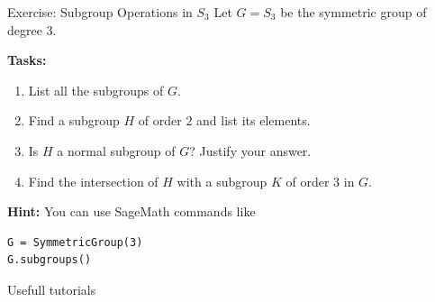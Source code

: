 \documentclass[10pt]{beamer}
\begin{document}
\begin{frame}[fragile]{Exercise: Subgroup Operations in $S_3$}
Let $G = S_3$ be the symmetric group of degree 3.

\textbf{Tasks:}
\begin{enumerate}
\item List all the subgroups of $G$.
\item Find a subgroup $H$ of order $2$ and list its elements.
\item Is $H$ a normal subgroup of $G$? Justify your answer.
\item Find the intersection of $H$ with a subgroup $K$ of order $3$ in $G$.
\end{enumerate}

\vspace{2mm}
\textbf{Hint:} You can use SageMath commands like\\
\vspace{0.5cm}
\begin{lstlisting}[style=mypython]
G = SymmetricGroup(3)
G.subgroups()
\end{lstlisting}
\end{frame}

\begin{frame}{Usefull tutorials}

\end{frame}
\end{document}
